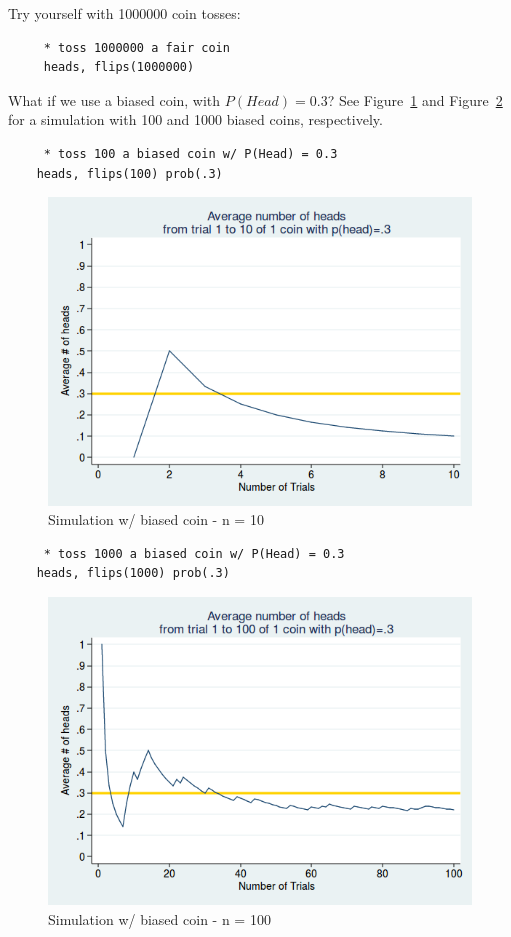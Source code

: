 \documentclass[11pt]{article}
\begin{document}
	 
Try yourself with 1000000 coin tosses:
	 
	\begin{verbatim}
	 * toss 1000000 a fair coin
	 heads, flips(1000000)
	\end{verbatim}
	


	What if we use a biased coin, with $P(Head) = 0.3$? See Figure~\ref{f4} and Figure~\ref{f5} for a simulation with 100 and 1000 biased coins, respectively.\\

	\begin{verbatim}
	 * toss 100 a biased coin w/ P(Head) = 0.3
	heads, flips(100) prob(.3)	 
	\end{verbatim}

\begin{figure}[htp]
\centering
\includegraphics[scale=0.50]{coin_sim_10_biased.png}
\caption{Simulation w/ biased coin - n = 10}
\label{f4}
\end{figure}
	
	\begin{verbatim}
	 * toss 1000 a biased coin w/ P(Head) = 0.3
	heads, flips(1000) prob(.3)	 
	\end{verbatim}


\begin{figure}[htp]
\centering
\includegraphics[scale=0.50]{coin_sim_100_biased.png}
\caption{Simulation w/ biased coin - n = 100}
\label{f5}
\end{figure}
\end{document}
